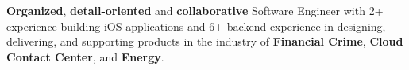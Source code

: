 
\begin{cvparagraph}
    \textbf{Organized}, \textbf{detail-oriented} and \textbf{collaborative} Software Engineer with 2+ experience building iOS applications and 6+ backend experience in designing, delivering, and supporting products in the industry of \textbf{Financial Crime}, \textbf{Cloud Contact Center}, and \textbf{Energy}.

\end{cvparagraph}




